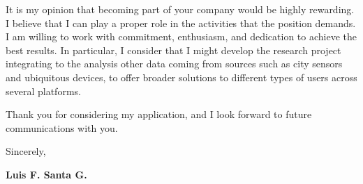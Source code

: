 \documentclass[11pt, a4paper]{awesome-cv}
\begin{document}
\begin{cvletter}
It is my opinion that becoming part of your company would be highly rewarding. I believe that I can play a proper role in the activities that the position demands. I am willing to work with commitment, enthusiasm, and dedication to achieve the best results. In particular, I consider that I might develop the research project integrating to the analysis other data coming from sources such as city sensors and ubiquitous devices, to offer broader solutions to different types of users across several platforms.\par
Thank you for considering my application, and I look forward to future communications with you.\par
Sincerely,\par
{\bf Luis F. Santa G.}
\end{cvletter}


\end{document}
